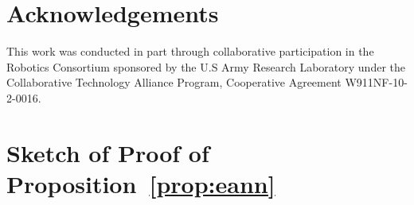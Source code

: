 \section*{Acknowledgements} 
This work was conducted in part through collaborative participation in the Robotics Consortium sponsored by the U.S Army Research Laboratory under the Collaborative Technology Alliance Program, Cooperative Agreement W911NF-10-2-0016. 

%
%
%
%
%



\section{Sketch of Proof of Proposition~\ref{prop:eann}}
